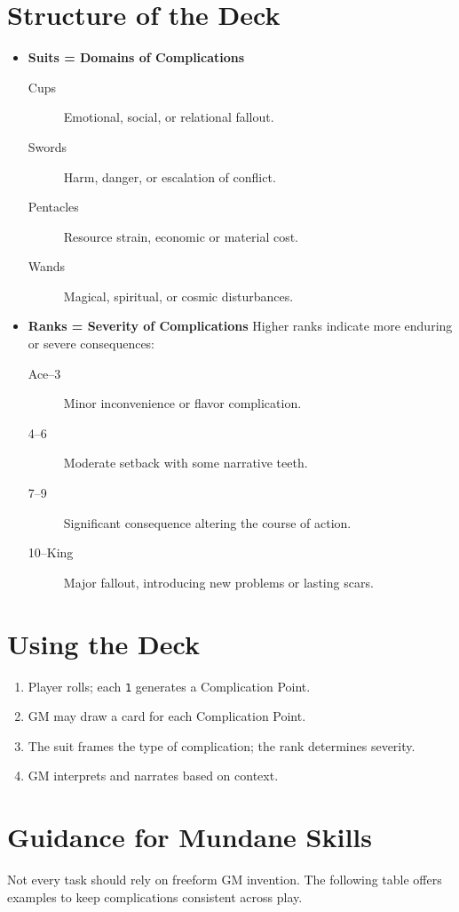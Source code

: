 \documentclass[12pt]{article}
\begin{document}
\section{Structure of the Deck}
\begin{itemize}
  \item \textbf{Suits = Domains of Complications}
    \begin{description}
      \item[ Cups] Emotional, social, or relational fallout.
      \item[ Swords] Harm, danger, or escalation of conflict.
      \item[ Pentacles] Resource strain, economic or material cost.
      \item[ Wands] Magical, spiritual, or cosmic disturbances.
    \end{description}
  \item \textbf{Ranks = Severity of Complications}  
  Higher ranks indicate more enduring or severe consequences:
  \begin{description}
    \item[Ace–3] Minor inconvenience or flavor complication.
    \item[4–6] Moderate setback with some narrative teeth.
    \item[7–9] Significant consequence altering the course of action.
    \item[10–King] Major fallout, introducing new problems or lasting scars.
  \end{description}
\end{itemize}

\section{Using the Deck}
\begin{enumerate}
  \item Player rolls; each \texttt{1} generates a Complication Point.
  \item GM may draw a card for each Complication Point.
  \item The suit frames the type of complication; the rank determines severity.
  \item GM interprets and narrates based on context.
\end{enumerate}

\section{Guidance for Mundane Skills}
Not every task should rely on freeform GM invention. The following table offers examples to keep complications consistent across play.
\end{document}
